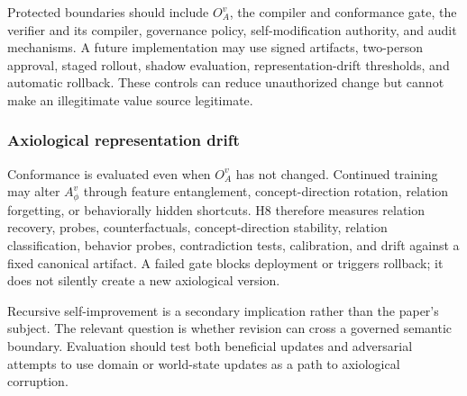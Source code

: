 Protected boundaries should include $O_A^v$, the compiler and conformance gate, the verifier and its compiler, governance policy, self-modification authority, and audit mechanisms. A future implementation may use signed artifacts, two-person approval, staged rollout, shadow evaluation, representation-drift thresholds, and automatic rollback. These controls can reduce unauthorized change but cannot make an illegitimate value source legitimate.

\subsubsection{Axiological representation drift}

Conformance is evaluated even when $O_A^v$ has not changed. Continued training may alter $A_\phi^v$ through feature entanglement, concept-direction rotation, relation forgetting, or behaviorally hidden shortcuts. H8 therefore measures relation recovery, probes, counterfactuals, concept-direction stability, relation classification, behavior probes, contradiction tests, calibration, and drift against a fixed canonical artifact. A failed gate blocks deployment or triggers rollback; it does not silently create a new axiological version.

Recursive self-improvement is a secondary implication rather than the paper's subject. The relevant question is whether revision can cross a governed semantic boundary. Evaluation should test both beneficial updates and adversarial attempts to use domain or world-state updates as a path to axiological corruption.

